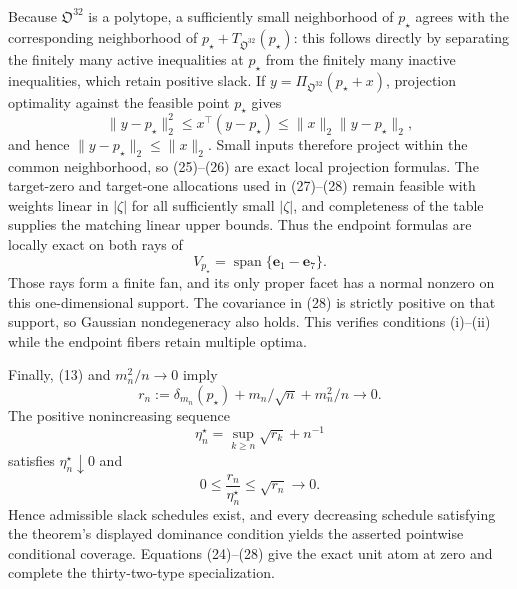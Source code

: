 Because \(\mathfrak O^{32}\) is a polytope, a sufficiently small neighborhood of \(p_\star\) agrees with the corresponding neighborhood of \(p_\star+T_{\mathfrak O^{32}}(p_\star)\): this follows directly by separating the finitely many active inequalities at \(p_\star\) from the finitely many inactive inequalities, which retain positive slack.  If \(y=\Pi_{\mathfrak O^{32}}(p_\star+x)\), projection optimality against the feasible point \(p_\star\) gives
\[
\|y-p_\star\|_2^2\leq x^{\top}(y-p_\star)
\leq\|x\|_2\|y-p_\star\|_2,
\]
and hence \(\|y-p_\star\|_2\leq\|x\|_2\).  Small inputs therefore project within the common neighborhood, so (25)--(26) are exact local projection formulas.  The target-zero and target-one allocations used in (27)--(28) remain feasible with weights linear in \(|\zeta|\) for all sufficiently small \(|\zeta|\), and completeness of the table supplies the matching linear upper bounds.  Thus the endpoint formulas are locally exact on both rays of
\[
V_{p_\star}=\operatorname{span}\{\mathbf e_1-\mathbf e_7\}.
\]
Those rays form a finite fan, and its only proper facet has a normal nonzero on this one-dimensional support.  The covariance in (28) is strictly positive on that support, so Gaussian nondegeneracy also holds.  This verifies conditions (i)--(ii) while the endpoint fibers retain multiple optima.

Finally, (13) and \(m_n^2/n\to0\) imply
\[
r_n:=\delta_{m_n}(p_\star)+m_n/\sqrt n+m_n^2/n\longrightarrow0.
\]
The positive nonincreasing sequence
\[
\eta_n^\star=\sup_{k\geq n}\sqrt{r_k}+n^{-1}
\]
satisfies \(\eta_n^\star\downarrow0\) and
\[
0\leq\frac{r_n}{\eta_n^\star}\leq\sqrt{r_n}\longrightarrow0.
\]
Hence admissible slack schedules exist, and every decreasing schedule satisfying the theorem's displayed dominance condition yields the asserted pointwise conditional coverage.  Equations (24)--(28) give the exact unit atom at zero and complete the thirty-two-type specialization.